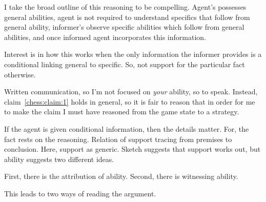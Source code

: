 \documentclass[10pt]{article}
\newcommand{\hozlinedash}[0]{%
  \noindent\hdashrule[0.5ex][c]{\textwidth}{.1pt}{2.5pt}
}
\begin{document}
I take the broad outline of this reasoning to be compelling.
Agent's possesses general abilities, agent is not required to understand specifics that follow from general ability, informer's observe specific abilities which follow from general abilities, and once informed agent incorporates this information.

Interest is in how this works when the only information the informer provides is a conditional linking general to specific.
So, not support for the particular fact otherwise.

\begin{note}
Written communication, so I'm not focused on \emph{your} ability, so to speak.
Instead, claim~\ref{chess:claim:1} holds in general, so it is fair to reason that in order for me to make the claim I must have reasoned from the game state to a strategy.
\end{note}

\hozlinedash

\begin{note}
  If the agent is given conditional information, then the details matter.
  For, the fact rests on the reasoning.
  Relation of support tracing from premises to conclusion.
  Here, support as generic.
  Sketch suggests that support works out, but ability suggests two different ideas.
\end{note}

\begin{note}
  First, there is the attribution of ability.
  Second, there is witnessing ability.

  This leads to two ways of reading the argument.
\end{note}
\end{document}

